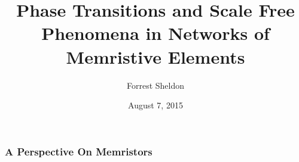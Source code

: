 \documentclass[mathserif]{beamer}
\title{Phase Transitions and Scale Free Phenomena in Networks of Memristive Elements}
\author{Forrest Sheldon}
\institute{UCSD}
\date{August 7, 2015}
\begin{document}
\begin{frame}
\titlepage
\end{frame}

\begin{frame}
\frametitle{A Perspective On Memristors}
\begin{columns}
\centering
{}

\end{columns}
\end{frame}
\end{document}
